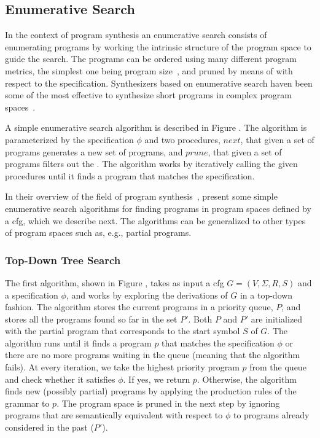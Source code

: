 \subsection{Enumerative Search}
\label{sec:enumerative-search}

In the context of program synthesis an enumerative search consists of
enumerating programs by working the intrinsic structure of the program space to
guide the search. The programs can be ordered using many different program
metrics, the simplest one being program size~\cite{Alur:sygus:2013}, and pruned
by means of  with respect to the specification.
Synthesizers based on enumerative search haven been some of the most effective
to synthesize short programs in complex program spaces~\cite{Gulwani2017}.

A simple enumerative search algorithm is described in Figure . The algorithm is parameterized by the
specification $\phi{}$ and two procedures, $next$, that given a set of programs
generates a new set of programs, and $prune$, that given a set of programs
filters out the . The algorithm works by iteratively calling the given procedures until
it finds a program that matches the specification.

In their overview of the field of program synthesis~\cite{Gulwani2017},
\citeauthor{Gulwani2017} present some simple enumerative search algorithms for
finding programs in program spaces defined by a \gls{cfg}, which we describe
next. The algorithms can be generalized to other types of program spaces such
as, e.g., partial programs.

\subsubsection{Top-Down Tree Search}
\label{sec:top-down-tree-search}

The first algorithm, shown in Figure , takes as input a \gls{cfg} $G = (V, \Sigma{}, R, S)$ and a
specification $\phi{}$, and works by exploring the derivations of $G$ in a
top-down fashion. The algorithm stores the current programs in a priority queue,
$P$, and stores all the programs found so far in the set $P'$. Both $P$ and $P'$
are initialized with the partial program that corresponds to the start symbol
$S$ of $G$. The algorithm runs until it finds a program $p$ that matches the
specification $\phi{}$ or there are no more programs waiting in the queue
(meaning that the algorithm fails). At every iteration, we take the highest
priority program $p$ from the queue and check whether it satisfies $\phi{}$. If
yes, we return $p$. Otherwise, the algorithm finds new (possibly partial)
programs by applying the production rules of the grammar to $p$. The program
space is pruned in the next step by ignoring programs that are semantically
equivalent with respect to $\phi{}$ to programs already considered in the past
($P'$).

